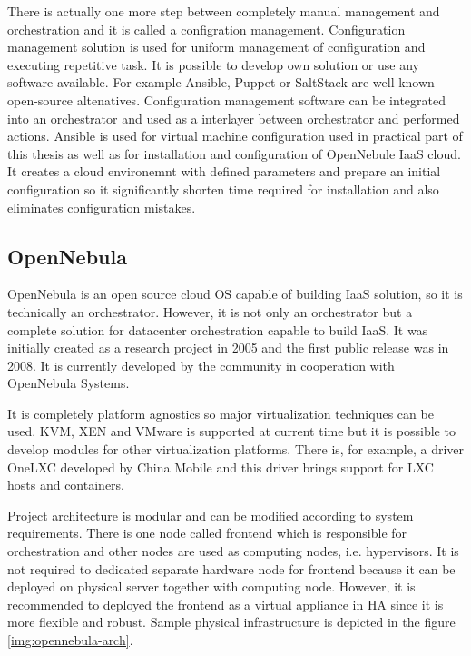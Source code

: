 There is actually one more step between completely manual management and orchestration and it is called a configration management. Configuration management solution is used for uniform management of configuration and executing repetitive task. It is possible to develop own solution or use any software available. For example Ansible, Puppet or SaltStack are well known open-source altenatives. Configuration management software can be integrated into an orchestrator and used as a interlayer between orchestrator and performed actions.
Ansible is used for virtual machine configuration used in practical part of this thesis as well as for installation and configuration of OpenNebule IaaS cloud. It creates a cloud environemnt with defined parameters and prepare an initial configuration so it significantly shorten time required for installation and also eliminates configuration mistakes.  

\subsection{OpenNebula}
OpenNebula is an open source cloud OS capable of building IaaS solution, so it is technically an orchestrator. \cite{opennebula} However, it is not only an orchestrator but a complete solution for datacenter orchestration capable to build \Ac{IaaS}. It was initially created as a research project in 2005 and the first public release was in 2008. It is currently developed by the community in cooperation with OpenNebula Systems.

It is completely platform agnostics so major virtualization techniques can be used. \Ac{KVM}, XEN and VMware is supported at current time but it is possible to develop modules for other virtualization platforms. There is, for example, a driver OneLXC developed by China Mobile and this driver brings support for \Ac{LXC} hosts and containers.

Project architecture is modular and can be modified according to system requirements. There is one node called frontend which is responsible for orchestration and other nodes are used as computing nodes, i.e. hypervisors. It is not required to dedicated separate hardware node for frontend because it can be deployed on physical server together with computing node. However, it is recommended to deployed the frontend as a virtual appliance in \Ac{HA} since it is more flexible and robust. Sample physical infrastructure is depicted in the figure \ref{img:opennebula-arch}.

